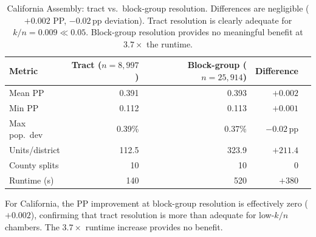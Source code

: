 \begin{table}[h]
\centering\small
\begin{tabular}{lrrrr}
\toprule
Metric & Tract ($n=8{,}997$) & Block-group ($n=25{,}914$) & Difference \\
\midrule
Mean PP       & 0.391 & 0.393 & $+0.002$ \\
Min PP        & 0.112 & 0.113 & $+0.001$ \\
Max pop.\ dev & 0.39\% & 0.37\% & $-0.02$\,pp \\
Units/district & 112.5 & 323.9 & $+211.4$ \\
County splits & 10 & 10 & $0$ \\
Runtime (s)   & 140 & 520 & $+380$ \\
\bottomrule
\end{tabular}
\caption{California Assembly: tract vs.\ block-group resolution. Differences
  are negligible ($+0.002$ PP, $-0.02$\,pp deviation). Tract resolution is
  clearly adequate for $k/n = 0.009 \ll 0.05$. Block-group resolution provides
  no meaningful benefit at $3.7\times$ the runtime.}
\label{tab:ca-comparison}
\end{table}

For California, the PP improvement at block-group resolution is effectively
zero ($+0.002$), confirming that tract resolution is more than adequate for
low-$k/n$ chambers. The $3.7\times$ runtime increase provides no benefit.
